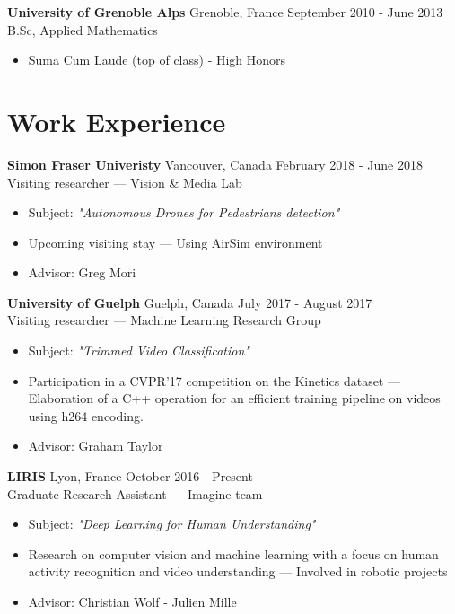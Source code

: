 \documentclass[10pt]{res} %
\begin{document}
\begin{resume}
\textbf{University of Grenoble Alps} \hfill Grenoble, France \hfill September 2010 - June 2013 \\
B.Sc, Applied Mathematics
\begin{itemize}
\item Suma Cum Laude (top of class) - High Honors
\end{itemize}
 

\section{\large Work Experience} 

\textbf{Simon Fraser Univeristy} \hfill Vancouver, Canada \hfill February 2018 - June 2018 \\
Visiting researcher --- Vision \& Media Lab
\begin{itemize}
\item Subject: \textit{"Autonomous Drones for Pedestrians detection" }
\item Upcoming visiting stay --- Using AirSim environment
\item Advisor: Greg Mori
\end{itemize}

\textbf{University of Guelph} \hfill Guelph, Canada \hfill July 2017 - August 2017 \\
Visiting researcher --- Machine Learning Research Group
\begin{itemize}
\item Subject: \textit{"Trimmed Video Classification"}
\item Participation in a CVPR'17 competition on the Kinetics dataset --- Elaboration of a C++ operation for an efficient training  pipeline on videos using h264 encoding.
\item Advisor: Graham Taylor
\end{itemize}

 \newpage
 
\textbf{LIRIS} \hfill Lyon, France \hfill October 2016 - Present \\
Graduate Research Assistant --- Imagine team
\begin{itemize} 
\item Subject: \textit{"Deep Learning for Human Understanding"}
\item Research on computer vision and machine learning with a focus on human activity recognition and video understanding ---  Involved in robotic projects
\item Advisor: Christian Wolf - Julien Mille
\end{itemize}


\end{resume}
\end{document}
